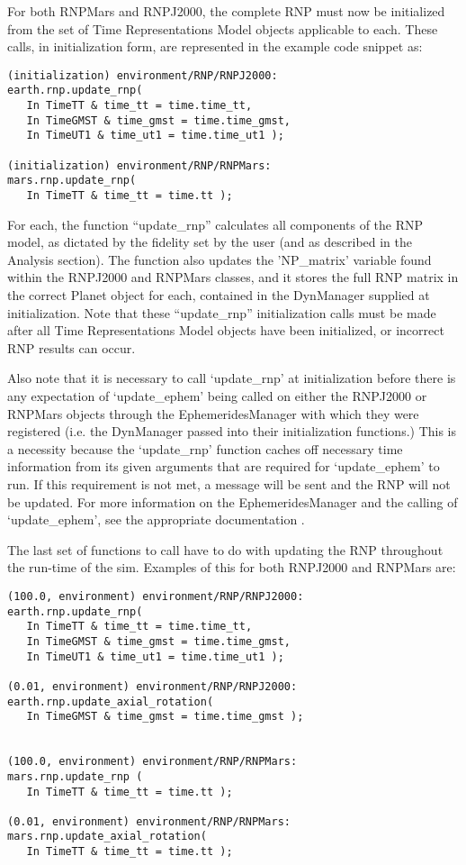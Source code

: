 For both RNPMars and RNPJ2000, the complete RNP must now be initialized from
the set of Time Representations Model objects applicable to each. These calls,
in initialization form, are represented in the example code snippet as:

\begin{verbatim}
(initialization) environment/RNP/RNPJ2000:
earth.rnp.update_rnp(
   In TimeTT & time_tt = time.time_tt,
   In TimeGMST & time_gmst = time.time_gmst,
   In TimeUT1 & time_ut1 = time.time_ut1 );

(initialization) environment/RNP/RNPMars:
mars.rnp.update_rnp(
   In TimeTT & time_tt = time.tt );
\end{verbatim}

For each, the function ``update\_rnp'' calculates all components of the RNP
model, as dictated by the fidelity set by the user (and as described in the
Analysis section). The function also updates the 'NP\_matrix' variable found
within the RNPJ2000 and RNPMars classes, and it stores the full RNP matrix in
the correct Planet object for each, contained in the DynManager supplied at
initialization. Note that these ``update\_rnp'' initialization calls must be
made after all Time Representations Model objects have been initialized, or
incorrect RNP results can occur.

Also note that it is necessary to call `update\_rnp' at initialization before
there is any expectation of `update\_ephem' being called on either
the RNPJ2000 or RNPMars objects through the EphemeridesManager with which they
were registered (i.e. the DynManager passed into their initialization
functions.) This is a necessity because the `update\_rnp' function caches
off necessary time information from its given arguments that are required
for `update\_ephem' to run. If this requirement is not met, a message will
be sent and the RNP will not be updated. For more information on the
EphemeridesManager and the calling of `update\_ephem', see
the appropriate documentation \cite{dynenv:EPHEMERIDES}.

The last set of functions to call have to do with updating the RNP throughout
the run-time of the sim. Examples of this for both RNPJ2000 and RNPMars are:

\begin{verbatim}
(100.0, environment) environment/RNP/RNPJ2000:
earth.rnp.update_rnp(
   In TimeTT & time_tt = time.time_tt,
   In TimeGMST & time_gmst = time.time_gmst,
   In TimeUT1 & time_ut1 = time.time_ut1 );

(0.01, environment) environment/RNP/RNPJ2000:
earth.rnp.update_axial_rotation(
   In TimeGMST & time_gmst = time.time_gmst );


(100.0, environment) environment/RNP/RNPMars:
mars.rnp.update_rnp (
   In TimeTT & time_tt = time.tt );

(0.01, environment) environment/RNP/RNPMars:
mars.rnp.update_axial_rotation(
   In TimeTT & time_tt = time.tt );
\end{verbatim}

